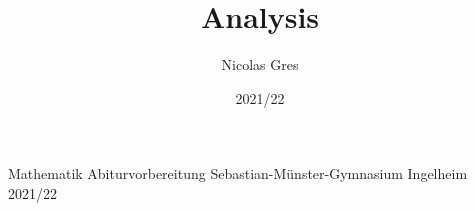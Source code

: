 \documentclass[oneside]{modern}
\title{Analysis}
\author{Nicolas Gres}
\date{2021/22}
\begin{document}
\nocite{*}

\firstpage
{Mathematik Abiturvorbereitung}
{Sebastian-Münster-Gymnasium Ingelheim}
{2021/22}

\addtableofcontents

\newpage






\end{document}
